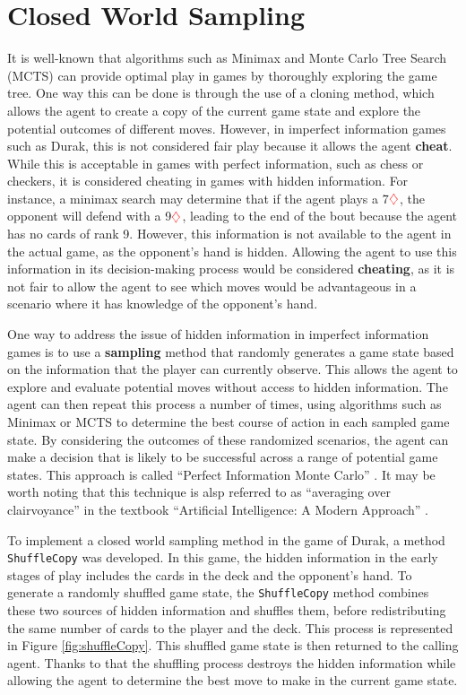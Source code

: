 \section{Closed World Sampling}
\label{closedWorld}
It is well-known that algorithms such as Minimax and Monte Carlo Tree Search (MCTS) can provide optimal play in games by thoroughly exploring the game tree. One way this can be done is through the use of a cloning method, which allows the agent to create a copy of the current game state and explore the potential outcomes of different moves. However, in imperfect information games such as Durak, this is not considered fair play because it allows the agent \textbf{cheat}. While this is acceptable in games with perfect information, such as chess or checkers, it is considered cheating in games with hidden information. For instance, a minimax search may determine that if the agent plays a 7$\textcolor{red}{\diamondsuit}$, the opponent will defend with a 9$\textcolor{red}{\diamondsuit}$, leading to the end of the bout because the agent has no cards of rank 9. However, this information is not available to the agent in the actual game, as the opponent's hand is hidden. Allowing the agent to use this information in its decision-making process would be considered \textbf{cheating}, as it is not fair to allow the agent to see which moves would be advantageous in a scenario where it has knowledge of the opponent's hand.

One way to address the issue of hidden information in imperfect information games is to use a \textbf{sampling} method that randomly generates a game state based on the information that the player can currently observe. This allows the agent to explore and evaluate potential moves without access to hidden information. The agent can then repeat this process a number of times, using algorithms such as Minimax or MCTS to determine the best course of action in each sampled game state. By considering the outcomes of these randomized scenarios, the agent can make a decision that is likely to be successful across a range of potential game states. This approach is called  ``Perfect Information Monte Carlo'' \citep{PerfectInformationMC}. It may be worth noting that this technique is alsp referred to as ``averaging over clairvoyance'' in the textbook ``Artificial Intelligence: A Modern Approach'' \citep{AI4Ed}.

To implement a closed world sampling method in the game of Durak, a method \texttt{ShuffleCopy} was developed. In this game, the hidden information in the early stages of play includes the cards in the deck and the opponent's hand. To generate a randomly shuffled game state, the \texttt{ShuffleCopy} method combines these two sources of hidden information and shuffles them, before redistributing the same number of cards to the player and the deck. This process is represented in Figure \ref{fig:shuffleCopy}. This shuffled game state is then returned to the calling agent. Thanks to that the shuffling process destroys the hidden information while allowing the agent to determine the best move to make in the current game state.

